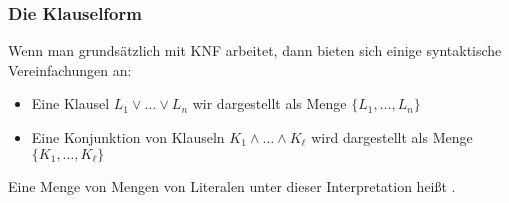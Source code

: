 \documentclass[aspectratio=1610,onlymath]{beamer}
\begin{document}
\begin{frame}\frametitle{Die Klauselform}

Wenn man grundsätzlich mit KNF arbeitet, dann bieten sich einige syntaktische Vereinfachungen an:
\begin{itemize}
\item Eine Klausel $L_1\vee\ldots\vee L_n$ wir dargestellt als Menge $\{L_1,\ldots,L_n\}$
\item Eine Konjunktion von Klauseln $K_1\wedge\ldots\wedge K_\ell$ wird dargestellt als Menge $\{K_1,\ldots,K_\ell\}$
\end{itemize}
Eine Menge von Mengen von Literalen unter dieser Interpretation heißt .
\medskip\pause


\end{frame}
\end{document}
